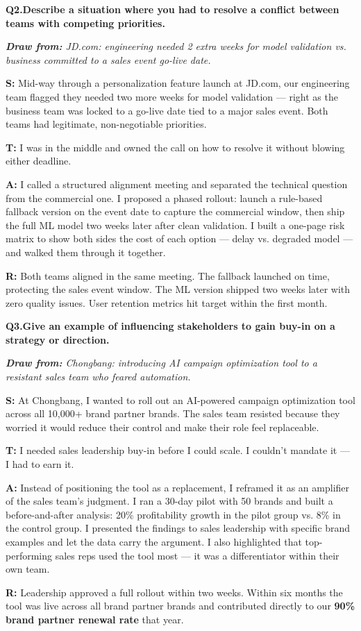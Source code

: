 \documentclass[10pt, letterpaper]{article}
\newcommand{\q}[2]{%
    \smallskip
    \noindent\textbf{\small Q#1.}\quad\textbf{#2}
    \vspace{3pt}
}
\newcommand{\hint}[1]{%
    \begin{notebox}
    \footnotesize\textit{\textbf{Draw from:} #1}
    \end{notebox}
}
\newcommand{\s}[1]{\textbf{\textcolor{starlabel}{S:}} #1}
\newcommand{\ta}[1]{\textbf{\textcolor{starlabel}{T:}} #1}
\newcommand{\ac}[1]{\textbf{\textcolor{starlabel}{A:}} #1}
\newcommand{\res}[1]{\textbf{\textcolor{starlabel}{R:}} #1}
\begin{document}
\q{2}{Describe a situation where you had to resolve a conflict between teams with competing priorities.}
\hint{JD.com: engineering needed 2 extra weeks for model validation vs. business committed to a sales event go-live date.}

\begin{answerbox}
\footnotesize
\s{Mid-way through a personalization feature launch at JD.com, our engineering team flagged they needed two more weeks for model validation --- right as the business team was locked to a go-live date tied to a major sales event. Both teams had legitimate, non-negotiable priorities.}

\medskip
\ta{I was in the middle and owned the call on how to resolve it without blowing either deadline.}

\medskip
\ac{I called a structured alignment meeting and separated the technical question from the commercial one. I proposed a phased rollout: launch a rule-based fallback version on the event date to capture the commercial window, then ship the full ML model two weeks later after clean validation. I built a one-page risk matrix to show both sides the cost of each option --- delay vs. degraded model --- and walked them through it together.}

\medskip
\res{Both teams aligned in the same meeting. The fallback launched on time, protecting the sales event window. The ML version shipped two weeks later with zero quality issues. User retention metrics hit target within the first month.}
\end{answerbox}

\q{3}{Give an example of influencing stakeholders to gain buy-in on a strategy or direction.}
\hint{Chongbang: introducing AI campaign optimization tool to a resistant sales team who feared automation.}

\begin{answerbox}
\footnotesize
\s{At Chongbang, I wanted to roll out an AI-powered campaign optimization tool across all 10,000+ brand partner brands. The sales team resisted because they worried it would reduce their control and make their role feel replaceable.}

\medskip
\ta{I needed sales leadership buy-in before I could scale. I couldn't mandate it --- I had to earn it.}

\medskip
\ac{Instead of positioning the tool as a replacement, I reframed it as an amplifier of the sales team's judgment. I ran a 30-day pilot with 50 brands and built a before-and-after analysis: 20\% profitability growth in the pilot group vs. 8\% in the control group. I presented the findings to sales leadership with specific brand examples and let the data carry the argument. I also highlighted that top-performing sales reps used the tool most --- it was a differentiator within their own team.}

\medskip
\res{Leadership approved a full rollout within two weeks. Within six months the tool was live across all brand partner brands and contributed directly to our \textbf{90\% brand partner renewal rate} that year.}
\end{answerbox}
\end{document}
